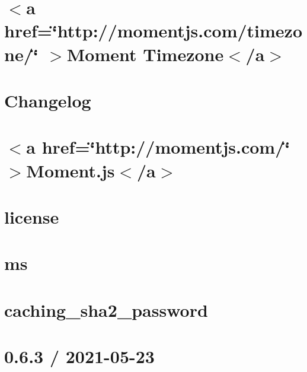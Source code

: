 \documentclass[twoside]{book}
\newcommand{\+}{\discretionary{\mbox{\scriptsize$\hookleftarrow$}}{}{}}
\begin{document}
\chapter{\texorpdfstring{$<$}{<}a href=\char`\"{}http\+://momentjs.\+com/timezone/\char`\"{} \texorpdfstring{$>$}{>}Moment Timezone\texorpdfstring{$<$}{<}/a\texorpdfstring{$>$}{>}}
\label{md_Backend_nodejs_node_modules_moment_timezone_README}

\chapter{Changelog}
\label{md_Backend_nodejs_node_modules_moment_CHANGELOG}

\chapter{\texorpdfstring{$<$}{<}a href=\char`\"{}http\+://momentjs.\+com/\char`\"{} \texorpdfstring{$>$}{>}Moment.\+js\texorpdfstring{$<$}{<}/a\texorpdfstring{$>$}{>}}
\label{md_Backend_nodejs_node_modules_moment_README}

\chapter{license}
\label{md_Backend_nodejs_node_modules_ms_license}

\chapter{ms}
\label{md_Backend_nodejs_node_modules_ms_readme}

\chapter{caching\+\_\+sha2\+\_\+password}
\label{md_Backend_nodejs_node_modules_mysql2_lib_auth_plugins_caching_sha2_password}

\chapter{0.6.3 / 2021-\/05-\/23}
\label{md_Backend_nodejs_node_modules_mysql2_node_modules_iconv_lite_Changelog}

\end{document}
